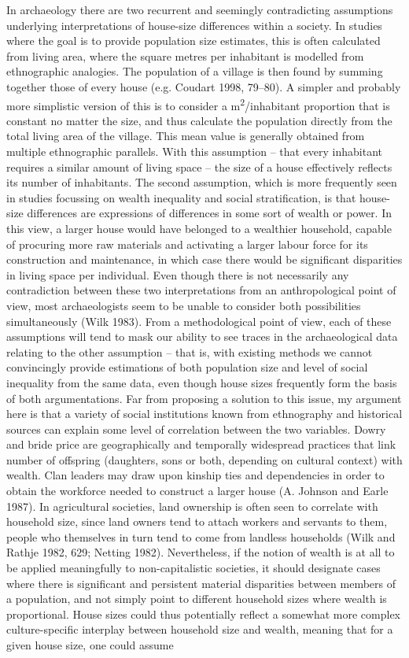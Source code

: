 \documentclass[
  12pt,
  a4paper, twoside]{book}
\begin{document}
In archaeology there are two recurrent and seemingly contradicting assumptions underlying interpretations of house-size differences within a society. In studies where the goal is to provide population size estimates, this is often calculated from living area, where the square metres per inhabitant is modelled from ethnographic analogies. The population of a village is then found by summing together those of every house (e.g. Coudart 1998, 79--80). A simpler and probably more simplistic version of this is to consider a m\textsuperscript{2}/inhabitant proportion that is constant no matter the size, and thus calculate the population directly from the total living area of the village. This mean value is generally obtained from multiple ethnographic parallels. With this assumption -- that every inhabitant requires a similar amount of living space -- the size of a house effectively reflects its number of inhabitants. The second assumption, which is more frequently seen in studies focussing on wealth inequality and social stratification, is that house-size differences are expressions of differences in some sort of wealth or power. In this view, a larger house would have belonged to a wealthier household, capable of procuring more raw materials and activating a larger labour force for its construction and maintenance, in which case there would be significant disparities in living space per individual. Even though there is not necessarily any contradiction between these two interpretations from an anthropological point of view, most archaeologists seem to be unable to consider both possibilities simultaneously (Wilk 1983). From a methodological point of view, each of these assumptions will tend to mask our ability to see traces in the archaeological data relating to the other assumption -- that is, with existing methods we cannot convincingly provide estimations of both population size and level of social inequality from the same data, even though house sizes frequently form the basis of both argumentations. Far from proposing a solution to this issue, my argument here is that a variety of social institutions known from ethnography and historical sources can explain some level of correlation between the two variables. Dowry and bride price are geographically and temporally widespread practices that link number of offspring (daughters, sons or both, depending on cultural context) with wealth. Clan leaders may draw upon kinship ties and dependencies in order to obtain the workforce needed to construct a larger house (A. Johnson and Earle 1987). In agricultural societies, land ownership is often seen to correlate with household size, since land owners tend to attach workers and servants to them, people who themselves in turn tend to come from landless households (Wilk and Rathje 1982, 629; Netting 1982). Nevertheless, if the notion of wealth is at all to be applied meaningfully to non-capitalistic societies, it should designate cases where there is significant and persistent material disparities between members of a population, and not simply point to different household sizes where wealth is proportional. House sizes could thus potentially reflect a somewhat more complex culture-specific interplay between household size and wealth, meaning that for a given house size, one could assume 
\end{document}
